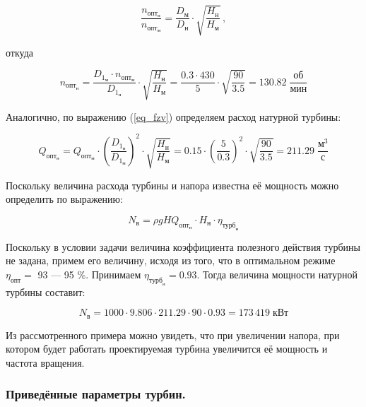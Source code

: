 $$
  \frac{n_{\text{опт}_{\text{н}}}}{n_{\text{опт}_{\text{м}}}} = \frac{D_{\text{м}}}{D_{\text{н}}} \cdot \sqrt{\frac{H_{\text{н}}}{H_{\text{м}}}} \, ,
$$

откуда

$$
   n_{\text{опт}_{\text{н}}} = \frac{D_{1_\text{м}} \cdot n_{\text{опт}_{\text{м}}} }{D_{1_\text{н}}} \cdot \sqrt{\frac{H_{\text{н}}}{H_{\text{м}}}}  = \frac{0.3 \cdot 430}{5} \cdot \sqrt{\frac{90}{3.5}} = 130.82 \; \frac{\text{об} }{\text{мин} }
$$

Аналогично, по выражению (\ref{eq_fzv}) определяем расход натурной турбины:

$$
    Q_{\text{опт}_{\text{н}}} =  Q_{\text{опт}_{\text{м}}} \cdot \left( \frac{D_{1_\text{н}} }{D_{1_\text{м}}} \right)^2  \cdot \sqrt{\frac{H_{\text{н}}}{H_{\text{м}}}} = 0.15 \cdot \left( \frac{5}{0.3} \right)^2 \cdot \sqrt{\frac{90}{3.5}} = 211.29 \; \frac{\text{м}^3 }{\text{с} }
$$

Поскольку величина расхода турбины и напора известна её мощность можно определить по выражению:

$$
   N_\text{в} = \rho g H Q_{\text{опт}_{\text{н}}} \cdot H_{\text{н}} \cdot \eta_{\text{турб}_{\text{н}}}
$$

Поскольку в условии задачи величина коэффициента полезного действия турбины не задана, примем его величину, исходя из того, что в оптимальном режиме $\eta_{\text{опт}}= $ 93 --- 95 \%. Принимаем $\eta_{\text{турб}_{\text{н}}} = 0.93$. Тогда величина мощности натурной турбины составит:

$$
   N_\text{в} = 1000 \cdot 9.806 \cdot 211.29 \cdot 90 \cdot 0.93 = 173\,419  \; \text{кВт}
$$


\vspace{1 cm}

Из рассмотренного примера можно увидеть, что при увеличении напора, при котором будет работать проектируемая турбина увеличится её мощность и частота вращения.



\subsubsection{Приведённые параметры турбин.}

